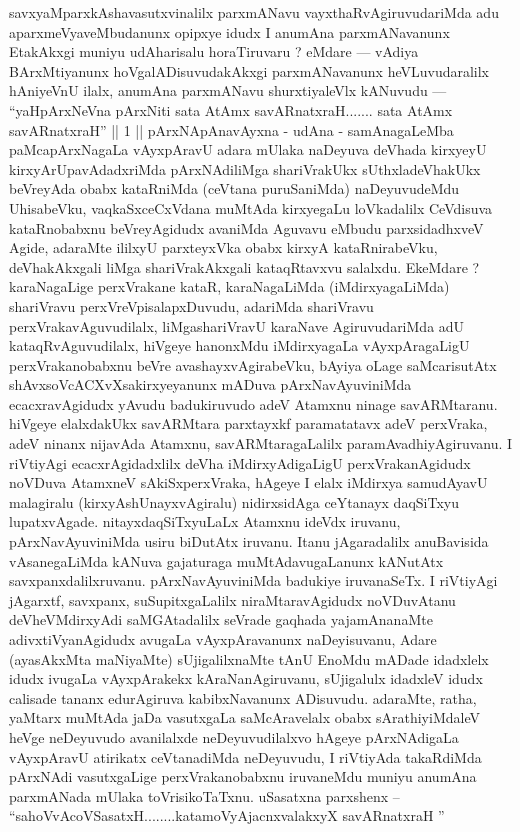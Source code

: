 \begin{artha}
savxyaMparxkAshavasutxvinalilx parxmANavu vayxthaRvAgiruvudariMda adu aparxmeVyaveMbudanunx opipxye idudx I anumAna parxmANavanunx EtakAkxgi muniyu udAharisalu horaTiruvaru ? eMdare --- vAdiya BArxMtiyanunx hoVgalADisuvudakAkxgi parxmANavanunx heVLuvudaralilx hAniyeVnU ilalx, anumAna parxmANavu shurxtiyaleVlx kANuvudu --- ``yaHpArxNeVna pArxNiti sata AtAmx savARnatxraH....... sata AtAmx savARnatxraH'' || 1 || pArxNApAnavAyxna - udAna - samAnagaLeMba paMcapArxNagaLa vAyxpAravU adara mUlaka naDeyuva deVhada kirxyeyU kirxyArUpavAdadxriMda pArxNAdiliMga shariVrakUkx sUthxladeVhakUkx beVreyAda obabx kataRniMda (ceVtana puruSaniMda) naDeyuvudeMdu UhisabeVku, vaqkaSxceCxVdana muMtAda kirxyegaLu loVkadalilx CeVdisuva kataRnobabxnu beVreyAgidudx avaniMda Aguvavu eMbudu parxsidadhxveV Agide, adaraMte ililxyU parxteyxVka obabx kirxyA kataRnirabeVku, deVhakAkxgali liMga shariVrakAkxgali kataqRtavxvu salalxdu. EkeMdare ? karaNagaLige perxVrakane kataR, karaNagaLiMda (iMdirxyagaLiMda) shariVravu perxVreVpisalapxDuvudu, adariMda shariVravu perxVrakavAguvudilalx, liMgashariVravU karaNave AgiruvudariMda adU kataqRvAguvudilalx, hiVgeye hanonxMdu iMdirxyagaLa vAyxpAragaLigU perxVrakanobabxnu beVre avashayxvAgirabeVku, bAyiya oLage saMcarisutAtx shAvxsoVcACXvXsakirxyeyanunx mADuva pArxNavAyuviniMda ecacxravAgidudx yAvudu badukiruvudo adeV Atamxnu ninage savARMtaranu. hiVgeye elalxdakUkx savARMtara parxtayxkf paramatatavx adeV perxVraka, adeV ninanx nijavAda Atamxnu, savARMtaragaLalilx paramAvadhiyAgiruvanu. I riVtiyAgi ecacxrAgidadxlilx deVha iMdirxyAdigaLigU perxVrakanAgidudx noVDuva AtamxneV sAkiSxperxVraka, hAgeye I elalx iMdirxya samudAyavU malagiralu (kirxyAshUnayxvAgiralu) nidirxsidAga ceYtanayx daqSiTxyu lupatxvAgade. nitayxdaqSiTxyuLaLx Atamxnu ideVdx iruvanu, pArxNavAyuviniMda usiru biDutAtx iruvanu. Itanu jAgaradalilx anuBavisida vAsanegaLiMda kANuva gajaturaga muMtAdavugaLanunx kANutAtx savxpanxdalilxruvanu. pArxNavAyuviniMda badukiye iruvanaSeTx. I riVtiyAgi jAgarxtf, savxpanx, suSupitxgaLalilx niraMtaravAgidudx noVDuvAtanu deVheVMdirxyAdi saMGAtadalilx seVrade gaqhada yajamAnanaMte adivxtiVyanAgidudx avugaLa vAyxpAravanunx naDeyisuvanu, Adare (ayasAkxMta maNiyaMte) sUjigalilxnaMte tAnU EnoMdu mADade idadxlelx idudx ivugaLa vAyxpArakekx kAraNanAgiruvanu, sUjigalulx idadxleV idudx calisade tananx edurAgiruva kabibxNavanunx ADisuvudu. adaraMte, ratha, yaMtarx muMtAda jaDa vasutxgaLa saMcAravelalx obabx sArathiyiMdaleV heVge neDeyuvudo avanilalxde neDeyuvudilalxvo hAgeye pArxNAdigaLa vAyxpAravU atirikatx ceVtanadiMda neDeyuvudu, I riVtiyAda takaRdiMda pArxNAdi vasutxgaLige perxVrakanobabxnu iruvaneMdu muniyu anumAna parxmANada mUlaka toVrisikoTaTxnu. uSasatxna parxshenx -- ``sahoVvAcoVSasatxH........katamoVyAjacnxvalakxyX savARnatxraH ''
\end{artha}


